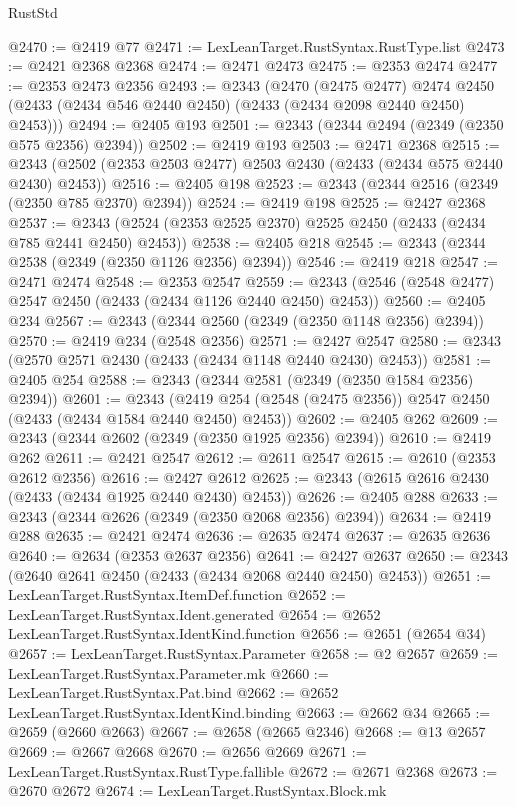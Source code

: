 \begin{lexlean}{RustStd}
\begin{coremodule}
{\begin{coremodule}
{{{{{{{{{{{{{{{{{{{{{{{{{{{{{{{{{{{{{{{{{{{{{{{{{{{{{{{@2470 := @2419 @77
@2471 := LexLeanTarget.RustSyntax.RustType.list
@2473 := @2421 @2368 @2368
@2474 := @2471 @2473
@2475 := @2353 @2474
@2477 := @2353 @2473 @2356
@2493 := @2343
    (@2470
      (@2475 @2477)
      @2474
      @2450
      (@2433 (@2434 @546 @2440 @2450) (@2433 (@2434 @2098 @2440 @2450) @2453)))
@2494 := @2405 @193
@2501 := @2343 (@2344 @2494 (@2349 (@2350 @575 @2356) @2394))
@2502 := @2419 @193
@2503 := @2471 @2368
@2515 := @2343 (@2502 (@2353 @2503 @2477) @2503 @2430 (@2433 (@2434 @575 @2440 @2430) @2453))
@2516 := @2405 @198
@2523 := @2343 (@2344 @2516 (@2349 (@2350 @785 @2370) @2394))
@2524 := @2419 @198
@2525 := @2427 @2368
@2537 := @2343 (@2524 (@2353 @2525 @2370) @2525 @2450 (@2433 (@2434 @785 @2441 @2450) @2453))
@2538 := @2405 @218
@2545 := @2343 (@2344 @2538 (@2349 (@2350 @1126 @2356) @2394))
@2546 := @2419 @218
@2547 := @2471 @2474
@2548 := @2353 @2547
@2559 := @2343 (@2546 (@2548 @2477) @2547 @2450 (@2433 (@2434 @1126 @2440 @2450) @2453))
@2560 := @2405 @234
@2567 := @2343 (@2344 @2560 (@2349 (@2350 @1148 @2356) @2394))
@2570 := @2419 @234 (@2548 @2356)
@2571 := @2427 @2547
@2580 := @2343 (@2570 @2571 @2430 (@2433 (@2434 @1148 @2440 @2430) @2453))
@2581 := @2405 @254
@2588 := @2343 (@2344 @2581 (@2349 (@2350 @1584 @2356) @2394))
@2601 := @2343
    (@2419 @254 (@2548 (@2475 @2356)) @2547 @2450 (@2433 (@2434 @1584 @2440 @2450) @2453))
@2602 := @2405 @262
@2609 := @2343 (@2344 @2602 (@2349 (@2350 @1925 @2356) @2394))
@2610 := @2419 @262
@2611 := @2421 @2547
@2612 := @2611 @2547
@2615 := @2610 (@2353 @2612 @2356)
@2616 := @2427 @2612
@2625 := @2343 (@2615 @2616 @2430 (@2433 (@2434 @1925 @2440 @2430) @2453))
@2626 := @2405 @288
@2633 := @2343 (@2344 @2626 (@2349 (@2350 @2068 @2356) @2394))
@2634 := @2419 @288
@2635 := @2421 @2474
@2636 := @2635 @2474
@2637 := @2635 @2636
@2640 := @2634 (@2353 @2637 @2356)
@2641 := @2427 @2637
@2650 := @2343 (@2640 @2641 @2450 (@2433 (@2434 @2068 @2440 @2450) @2453))
@2651 := LexLeanTarget.RustSyntax.ItemDef.function
@2652 := LexLeanTarget.RustSyntax.Ident.generated
@2654 := @2652 LexLeanTarget.RustSyntax.IdentKind.function
@2656 := @2651 (@2654 @34)
@2657 := LexLeanTarget.RustSyntax.Parameter
@2658 := @2 @2657
@2659 := LexLeanTarget.RustSyntax.Parameter.mk
@2660 := LexLeanTarget.RustSyntax.Pat.bind
@2662 := @2652 LexLeanTarget.RustSyntax.IdentKind.binding
@2663 := @2662 @34
@2665 := @2659 (@2660 @2663)
@2667 := @2658 (@2665 @2346)
@2668 := @13 @2657
@2669 := @2667 @2668
@2670 := @2656 @2669
@2671 := LexLeanTarget.RustSyntax.RustType.fallible
@2672 := @2671 @2368
@2673 := @2670 @2672
@2674 := LexLeanTarget.RustSyntax.Block.mk
}}}}}}}}}}}}}}}}}}}}}}}}}}}}}}}}}}}}}}}}}}}}}}}}}}}}}}}
\end{coremodule}}
\end{coremodule}
\end{lexlean}
